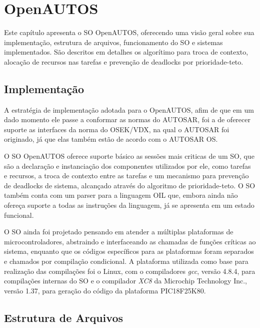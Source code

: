 \chapter{OpenAUTOS}

Este capítulo apresenta o SO OpenAUTOS, oferecendo uma visão geral sobre sua implementação, estrutura de arquivos, funcionamento do SO e sistemas implementados. São descritos em detalhes os algorítimo para troca de contexto, alocação de recursos nas tarefas e prevenção de deadlocks por prioridade-teto.

\section{Implementação}

A estratégia de implementação adotada para o OpenAUTOS, afim de que em um dado momento ele passe a conformar as normas do AUTOSAR, foi a de oferecer suporte as interfaces da norma do OSEK/VDX, na qual o AUTOSAR foi originado, já que elas também estão de acordo com o AUTOSAR OS.

O SO OpenAUTOS oferece suporte básico as sessões mais criticas de um SO, que são a declaração e instanciação dos componentes utilizados por ele, como tarefas e recursos, a troca de contexto entre as tarefas e um mecanismo para prevenção de deadlocks de sistema, alcançado através do algoritmo de prioridade-teto. O SO também conta com um parser para a linguagem OIL que, embora ainda não ofereça suporte a todas as instruções da linguagem, já se apresenta em um estado funcional.

O SO ainda foi projetado pensando em atender a múltiplas plataformas de microcontroladores, abstraindo e interfaceando as chamadas de funções críticas ao sistema, enquanto que os códigos específicos para as plataformas foram separados e chamados por compilação condicional. A plataforma utilizada como base para realização das compilações foi o Linux, com o compiladores \emph{gcc}, versão 4.8.4, para compilações internas do SO e o compilador \emph{XC8} da Microchip Technology Inc., versão 1.37, para geração do código da plataforma PIC18F25K80.




\section{Estrutura de Arquivos} \label{cap:cap4_estrutura}

